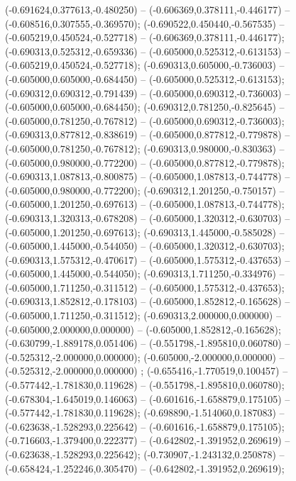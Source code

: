  (-0.691624,0.377613,-0.480250) -- (-0.606369,0.378111,-0.446177) -- (-0.608516,0.307555,-0.369570);
 (-0.690522,0.450440,-0.567535) -- (-0.605219,0.450524,-0.527718) -- (-0.606369,0.378111,-0.446177);
 (-0.690313,0.525312,-0.659336) -- (-0.605000,0.525312,-0.613153) -- (-0.605219,0.450524,-0.527718);
 (-0.690313,0.605000,-0.736003) -- (-0.605000,0.605000,-0.684450) -- (-0.605000,0.525312,-0.613153);
 (-0.690312,0.690312,-0.791439) -- (-0.605000,0.690312,-0.736003) -- (-0.605000,0.605000,-0.684450);
 (-0.690312,0.781250,-0.825645) -- (-0.605000,0.781250,-0.767812) -- (-0.605000,0.690312,-0.736003);
 (-0.690313,0.877812,-0.838619) -- (-0.605000,0.877812,-0.779878) -- (-0.605000,0.781250,-0.767812);
 (-0.690313,0.980000,-0.830363) -- (-0.605000,0.980000,-0.772200) -- (-0.605000,0.877812,-0.779878);
 (-0.690313,1.087813,-0.800875) -- (-0.605000,1.087813,-0.744778) -- (-0.605000,0.980000,-0.772200);
 (-0.690312,1.201250,-0.750157) -- (-0.605000,1.201250,-0.697613) -- (-0.605000,1.087813,-0.744778);
 (-0.690313,1.320313,-0.678208) -- (-0.605000,1.320312,-0.630703) -- (-0.605000,1.201250,-0.697613);
 (-0.690313,1.445000,-0.585028) -- (-0.605000,1.445000,-0.544050) -- (-0.605000,1.320312,-0.630703);
 (-0.690313,1.575312,-0.470617) -- (-0.605000,1.575312,-0.437653) -- (-0.605000,1.445000,-0.544050);
 (-0.690313,1.711250,-0.334976) -- (-0.605000,1.711250,-0.311512) -- (-0.605000,1.575312,-0.437653);
 (-0.690313,1.852812,-0.178103) -- (-0.605000,1.852812,-0.165628) -- (-0.605000,1.711250,-0.311512);
 (-0.690313,2.000000,0.000000) -- (-0.605000,2.000000,0.000000) -- (-0.605000,1.852812,-0.165628);
 (-0.630799,-1.889178,0.051406) -- (-0.551798,-1.895810,0.060780) -- (-0.525312,-2.000000,0.000000);
 (-0.605000,-2.000000,0.000000) -- (-0.525312,-2.000000,0.000000) ;
 (-0.655416,-1.770519,0.100457) -- (-0.577442,-1.781830,0.119628) -- (-0.551798,-1.895810,0.060780);
 (-0.678304,-1.645019,0.146063) -- (-0.601616,-1.658879,0.175105) -- (-0.577442,-1.781830,0.119628);
 (-0.698890,-1.514060,0.187083) -- (-0.623638,-1.528293,0.225642) -- (-0.601616,-1.658879,0.175105);
 (-0.716603,-1.379400,0.222377) -- (-0.642802,-1.391952,0.269619) -- (-0.623638,-1.528293,0.225642);
 (-0.730907,-1.243132,0.250878) -- (-0.658424,-1.252246,0.305470) -- (-0.642802,-1.391952,0.269619);
